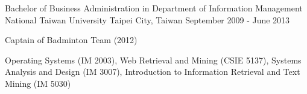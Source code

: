 \begin{cventries}
  \cventry
    {Bachelor of Business Administration in Department of Information Management} %
    {National Taiwan University} %
    {Taipei City, Taiwan} %
    {September 2009 - June 2013} %
    {
      \begin{cvitems} %
        \item {Captain of Badminton Team (2012)}
        \item {Operating Systems (IM 2003), Web Retrieval and Mining (CSIE 5137), Systems Analysis and Design (IM 3007), Introduction to Information Retrieval and Text Mining (IM 5030)}
      \end{cvitems}
    }

\end{cventries}
